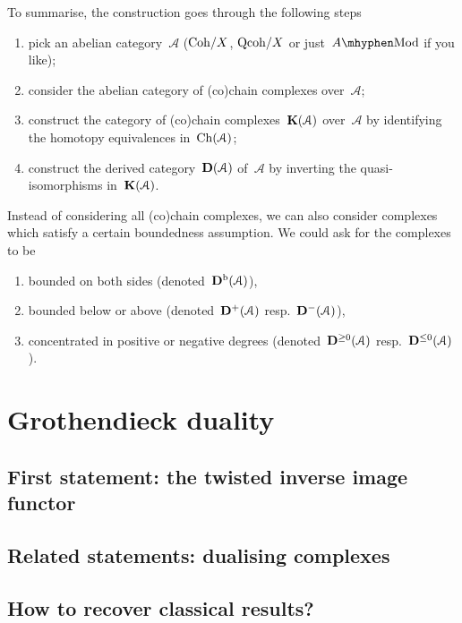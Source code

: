 \documentclass[10pt,a4paper]{article}
\begin{document}
To summarise, the construction goes through the following steps
\begin{enumerate}
  \item pick an abelian category~$\mathcal{A}$ ($\mathrm{Coh}/X$, $\mathrm{Qcoh}/X$ or just~$A\mhyphen\mathrm{Mod}$ if you like);
  \item consider the abelian category of (co)chain complexes over~$\mathcal{A}$;
  \item construct the category of (co)chain complexes~$\mathbf{K}(\mathcal{A})$ over~$\mathcal{A}$ by identifying the homotopy equivalences in~$\operatorname{Ch}(\mathcal{A})$;
  \item construct the derived category~$\mathbf{D}(\mathcal{A})$ of~$\mathcal{A}$ by inverting the quasi-isomorphisms in~$\mathbf{K}(\mathcal{A})$.
\end{enumerate}
Instead of considering all (co)chain complexes, we can also consider complexes which satisfy a certain boundedness assumption. We could ask for the complexes to be
\begin{enumerate}
  \item bounded on both sides (denoted~$\mathbf{D}^{\mathrm{b}}(\mathcal{A})$),
  \item bounded below or above (denoted~$\mathbf{D}^+(\mathcal{A})$ resp.\ $\mathbf{D}^-(\mathcal{A})$),
  \item concentrated in positive or negative degrees (denoted~$\mathbf{D}^{\geq 0}(\mathcal{A})$ resp.\ $\mathbf{D}^{\leq 0}(\mathcal{A})$).
\end{enumerate}


\section{Grothendieck duality}
\label{section:grothendieck-duality}
\subsection{First statement: the twisted inverse image functor}
\label{subsection:first-statement}

\subsection{Related statements: dualising complexes}
\label{subsection:related-statements}

\subsection{How to recover classical results?}
\label{subsection:classical-results}
\end{document}
